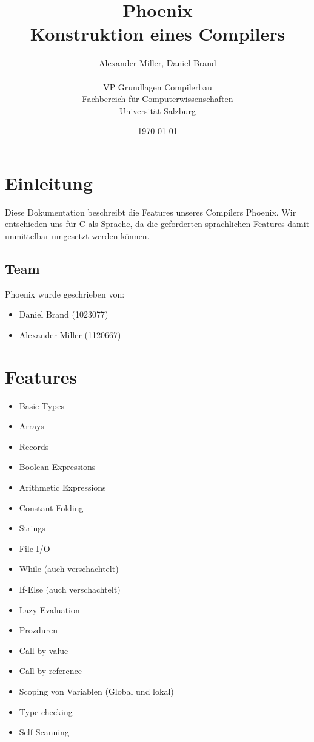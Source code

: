 \documentclass[a4paper]{article}
\title{Phoenix \\ \large Konstruktion eines Compilers}
\author{Alexander Miller, Daniel Brand \\ \\
		VP Grundlagen Compilerbau \\
		Fachbereich für Computerwissenschaften \\
		Universität Salzburg}
\date{\today}
\begin{document}
	\maketitle
	\tableofcontents
	\newpage

	\section{Einleitung}
	Diese Dokumentation beschreibt die Features unseres Compilers Phoenix.
	Wir entschieden uns für C als Sprache, da die geforderten sprachlichen Features damit unmittelbar umgesetzt werden können.

	\subsection{Team}
	Phoenix wurde geschrieben von:
	\begin{itemize}
		\item Daniel Brand (1023077)
		\item Alexander Miller (1120667)
	\end{itemize}

	\section{Features}
	\begin{multicols}{2}
	\begin{itemize}
		\item Basic Types
		\item Arrays
		\item Records
		\item Boolean Expressions
		\item Arithmetic Expressions
		\item Constant Folding
		\item Strings
		\item File I/O
		\item While (auch verschachtelt)
		\item If-Else (auch verschachtelt)
		\item Lazy Evaluation
		\item Prozduren
		\item Call-by-value
		\item Call-by-reference
		\item Scoping von Variablen (Global und lokal)
		\item Type-checking
		\item Self-Scanning
	\end{itemize}
	\end{multicols}
\end{document}
